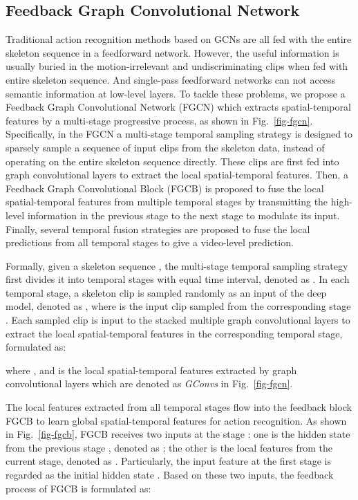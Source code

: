 \documentclass[runningheads]{llncs}
\begin{document}
\subsection{Feedback Graph Convolutional Network}
Traditional action recognition methods \cite{yan2018spatial,shi2019two,shi2019skeleton,li2019actional} based on GCNs are all fed with the entire skeleton sequence in a feedforward network. However, the useful information is usually buried in the motion-irrelevant and undiscriminating clips when fed with entire skeleton sequence. And single-pass feedforward networks can not access semantic information at low-level layers.
To tackle these problems, we propose a Feedback Graph Convolutional Network (FGCN) which extracts spatial-temporal features by a multi-stage progressive process, as shown in Fig.~\ref{fig-fgcn}. Specifically, in the FGCN a multi-stage temporal sampling strategy is designed to sparsely sample a sequence of input clips from the skeleton data, instead of operating on the entire skeleton sequence directly. These clips are first fed into graph convolutional layers to extract the local spatial-temporal features. Then, a Feedback Graph Convolutional Block (FGCB) is proposed to fuse the local spatial-temporal features from multiple temporal stages by transmitting the high-level information in the previous stage to the next stage to modulate its input. Finally, several temporal fusion strategies are proposed to fuse the local predictions from all temporal stages to give a video-level prediction.

Formally, given a skeleton sequence , the multi-stage temporal sampling strategy first divides it into  temporal stages with equal time interval, denoted as . In each temporal stage, a skeleton clip is sampled randomly as an input of the deep model, denoted as , where  is the input clip sampled from the corresponding stage . Each sampled clip  is input to the stacked multiple graph convolutional layers to extract the local spatial-temporal features in the corresponding temporal stage, formulated as:

where , and  is the local spatial-temporal features extracted by graph convolutional layers which are denoted as \textit{GConvs} in Fig.~\ref{fig-fgcn}.

The local features extracted from all temporal stages flow into the feedback block FGCB to learn global spatial-temporal features for action recognition. As shown in Fig.~\ref{fig-fgcb}, FGCB receives two inputs at the stage : one is the hidden state from the previous stage , denoted as ; the other is the local features from the current stage, denoted as . Particularly, the input feature at the first stage  is regarded as the initial hidden state . Based on these two inputs, the feedback process of FGCB is formulated as:
\end{document}
